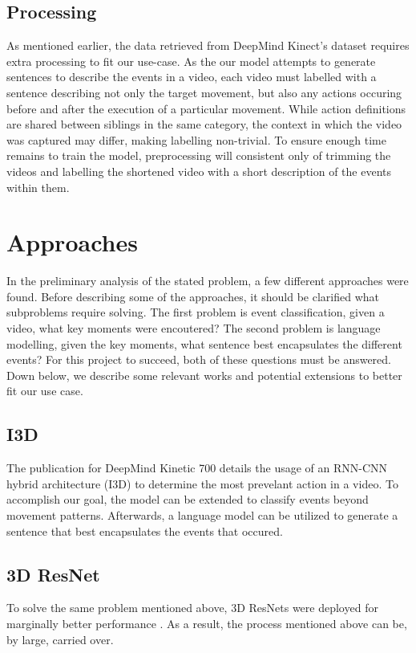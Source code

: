 \documentclass[10pt]{article}
\begin{document}
\subsection{Processing}
As mentioned earlier, the data retrieved from DeepMind Kinect's dataset requires extra processing to fit our use-case.
As the our model attempts to generate sentences to describe
the events in a video, each video must labelled with a sentence describing not only the target movement, but also
any actions occuring before and after the execution of a particular movement. While action definitions are shared between siblings
in the same category, the context in which the video was captured may differ, making labelling non-trivial.
To ensure enough time remains to train the model, preprocessing will consistent only of 
trimming the videos and labelling the shortened video with a short description of the events within them.

\section{Approaches}

In the preliminary analysis of the stated problem, a few different approaches were found. 
Before describing some of the approaches, it should be clarified what subproblems require solving.
The first problem is event classification, given a video, what key moments were encoutered?
The second problem is language modelling, given the key moments, what sentence best encapsulates 
the different events? For this project to succeed, both of these questions must be answered.
Down below, we describe some relevant works and potential extensions to better fit our use case. 

\subsection{I3D}
The publication for DeepMind Kinetic 700 details the usage of an RNN-CNN hybrid architecture (I3D) to determine 
the most prevelant action in a video. To accomplish our goal, the model can be extended to classify events beyond
movement patterns. Afterwards, a language model can be utilized to generate a sentence that best encapsulates the events that occured.

\subsection{3D ResNet}
To solve the same problem mentioned above, 3D ResNets were deployed for marginally better performance \cite{du2021revisiting}.
As a result, the process mentioned above can be, by large, carried over.
\end{document}
